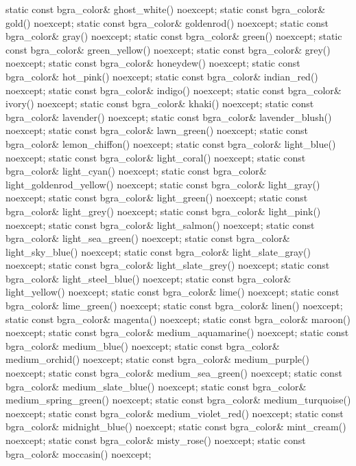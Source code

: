 \begin{codeblock}
{{{    static const bgra_color& ghost_white() noexcept;
    static const bgra_color& gold() noexcept;
    static const bgra_color& goldenrod() noexcept;
    static const bgra_color& gray() noexcept;
    static const bgra_color& green() noexcept;
    static const bgra_color& green_yellow() noexcept;
    static const bgra_color& grey() noexcept;
    static const bgra_color& honeydew() noexcept;
    static const bgra_color& hot_pink() noexcept;
    static const bgra_color& indian_red() noexcept;
    static const bgra_color& indigo() noexcept;
    static const bgra_color& ivory() noexcept;
    static const bgra_color& khaki() noexcept;
    static const bgra_color& lavender() noexcept;
    static const bgra_color& lavender_blush() noexcept;
    static const bgra_color& lawn_green() noexcept;
    static const bgra_color& lemon_chiffon() noexcept;
    static const bgra_color& light_blue() noexcept;
    static const bgra_color& light_coral() noexcept;
    static const bgra_color& light_cyan() noexcept;
    static const bgra_color& light_goldenrod_yellow() noexcept;
    static const bgra_color& light_gray() noexcept;
    static const bgra_color& light_green() noexcept;
    static const bgra_color& light_grey() noexcept;
    static const bgra_color& light_pink() noexcept;
    static const bgra_color& light_salmon() noexcept;
    static const bgra_color& light_sea_green() noexcept;
    static const bgra_color& light_sky_blue() noexcept;
    static const bgra_color& light_slate_gray() noexcept;
    static const bgra_color& light_slate_grey() noexcept;
    static const bgra_color& light_steel_blue() noexcept;
    static const bgra_color& light_yellow() noexcept;
    static const bgra_color& lime() noexcept;
    static const bgra_color& lime_green() noexcept;
    static const bgra_color& linen() noexcept;
    static const bgra_color& magenta() noexcept;
    static const bgra_color& maroon() noexcept;
    static const bgra_color& medium_aquamarine() noexcept;
    static const bgra_color& medium_blue() noexcept;
    static const bgra_color& medium_orchid() noexcept;
    static const bgra_color& medium_purple() noexcept;
    static const bgra_color& medium_sea_green() noexcept;
    static const bgra_color& medium_slate_blue() noexcept;
    static const bgra_color& medium_spring_green() noexcept;
    static const bgra_color& medium_turquoise() noexcept;
    static const bgra_color& medium_violet_red() noexcept;
    static const bgra_color& midnight_blue() noexcept;
    static const bgra_color& mint_cream() noexcept;
    static const bgra_color& misty_rose() noexcept;
    static const bgra_color& moccasin() noexcept;
}}}
\end{codeblock}
